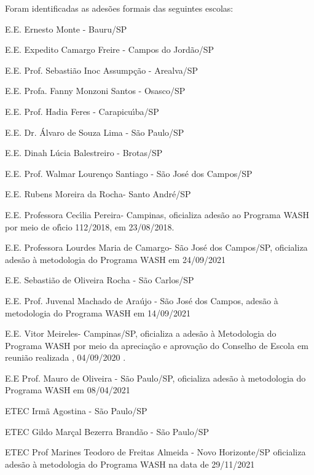 \documentclass[
12pt,		%
openright,	%
twoside,  %
a4paper,			%
chapter=TITLE,		%
english,			%
french,				%
spanish,			%
brazil				%
]{USPSC-classe/USPSC}
\begin{document}
Foram identificadas as ades\~oes formais das seguintes escolas:











\begin{alineas}
\item E.E. Ernesto Monte - Bauru/SP
\item E.E. Expedito Camargo Freire - Campos do Jord\~ao/SP
\item E.E. Prof. Sebasti\~ao Inoc Assump\c{c}\~ao - Arealva/SP
\item E.E. Profa. Fanny Monzoni Santos - Osasco/SP
\item E.E. Prof. Hadia Feres - Carapicu\'{\i}ba/SP
\item E.E. Dr. \'Alvaro de Souza Lima - S\~ao Paulo/SP
\item E.E. Dinah L\'ucia Balestreiro - Brotas/SP  
\item E.E. Prof. Walmar Louren\c{c}o Santiago - S\~ao Jos\'e dos Campos/SP
\item E.E. Rubens Moreira da Rocha- Santo Andr\'e/SP
\item E.E. Professora Cec\'{\i}lia Pereira- Campinas, oficializa ades\~ao ao Programa WASH por meio de of\'{\i}cio 112/2018, em 23/08/2018.
\item E.E. Professora Lourdes Maria de Camargo- S\~ao Jos\'e dos Campos/SP, oficializa ades\~ao \`a metodologia do Programa WASH em 24/09/2021
\item E.E. Sebasti\~ao de Oliveira Rocha - S\~ao Carlos/SP
\item E.E. Prof. Juvenal Machado de Ara\'ujo - S\~ao Jos\'e dos Campos, ades\~ao \`a metodologia do Programa WASH em 14/09/2021
\item E.E. Vitor Meireles- Campinas/SP, oficializa a ades\~ao \`a Metodologia do Programa WASH  por meio da aprecia\c{c}\~ao e aprova\c{c}\~ao do Conselho de Escola em reuni\~ao realizada , 04/09/2020 .
\item E.E Prof. Mauro de Oliveira - S\~ao Paulo/SP, oficializa ades\~ao \`a metodologia do Programa WASH em 08/04/2021
\item ETEC Irm\~a Agostina - S\~ao Paulo/SP
\item ETEC Gildo Mar\c{c}al Bezerra Brand\~ao - S\~ao Paulo/SP
\item ETEC Prof Marines Teodoro de Freitas Almeida - Novo Horizonte/SP oficializa ades\~ao \`a metodologia do Programa WASH na  data de 29/11/2021

\end{alineas}
\end{document}
